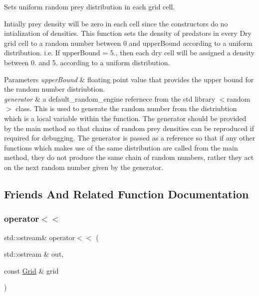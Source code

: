 Sets uniform random prey distribution in each grid cell.

Intially prey density will be zero in each cell since the constructors do no intialization of densities. This function sets the density of predators in every Dry grid cell to a random number between 0 and upper\+Bound according to a uniform distribution. i.\+e. If upper\+Bound = 5., then each dry cell will be assigned a density between 0. and 5. according to a uniform distribution.


\begin{DoxyParams}{Parameters}
{\em upper\+Bound} & floating point value that provides the upper bound for the random number distriubtion.\\
\hline
{\em generator} & a default\+\_\+random\+\_\+engine refernece from the std library $<$random$>$ class. This is used to generate the random number from the distriubtion which is a local variable within the function. The generator should be provided by the main method so that chains of random prey densities can be reproduced if required for debugging. The generator is passed as a reference so that if any other functions which makes use of the same distribution are called from the main method, they do not produce the same chain of random numbers, rather they act on the next random number given by the generator. \\
\hline
\end{DoxyParams}


\subsection{Friends And Related Function Documentation}
\mbox{\label{class_grid_a3513576c9cced69b185e4be8fe248e8c}} 
\subsubsection{\texorpdfstring{operator$<$$<$}{operator<<}}
{\footnotesize\ttfamily std\+::ostream\& operator$<$$<$ (\begin{DoxyParamCaption}\item[{std\+::ostream \&}]{out,  }\item[{const \hyperlink{class_grid}{Grid} \&}]{grid }\end{DoxyParamCaption})\hspace{0.3cm}{\ttfamily [friend]}}



